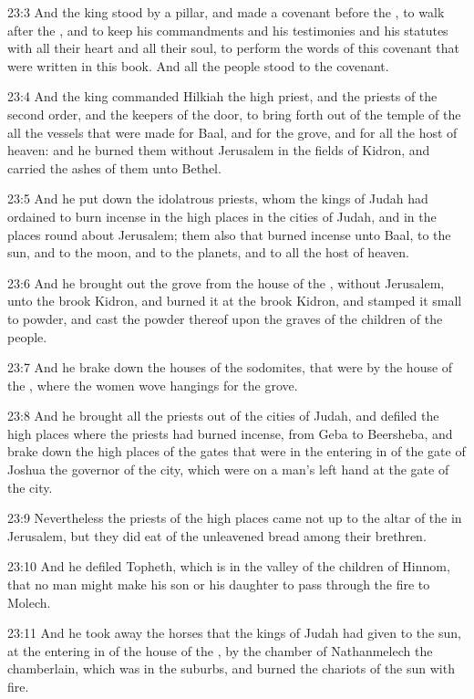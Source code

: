23:3 And the king stood by a pillar, and made a covenant before the \LORD, to walk after the \LORD, and to keep his commandments and his testimonies and his statutes with all their heart and all their soul, to perform the words of this covenant that were written in this book.  And all the people stood to the covenant.

23:4 And the king commanded Hilkiah the high priest, and the priests of the second order, and the keepers of the door, to bring forth out of the temple of the \LORD all the vessels that were made for Baal, and for the grove, and for all the host of heaven: and he burned them without Jerusalem in the fields of Kidron, and carried the ashes of them unto Bethel.

23:5 And he put down the idolatrous priests, whom the kings of Judah had ordained to burn incense in the high places in the cities of Judah, and in the places round about Jerusalem; them also that burned incense unto Baal, to the sun, and to the moon, and to the planets, and to all the host of heaven.

23:6 And he brought out the grove from the house of the \LORD, without Jerusalem, unto the brook Kidron, and burned it at the brook Kidron, and stamped it small to powder, and cast the powder thereof upon the graves of the children of the people.

23:7 And he brake down the houses of the sodomites, that were by the house of the \LORD, where the women wove hangings for the grove.

23:8 And he brought all the priests out of the cities of Judah, and defiled the high places where the priests had burned incense, from Geba to Beersheba, and brake down the high places of the gates that were in the entering in of the gate of Joshua the governor of the city, which were on a man's left hand at the gate of the city.

23:9 Nevertheless the priests of the high places came not up to the altar of the \LORD in Jerusalem, but they did eat of the unleavened bread among their brethren.

23:10 And he defiled Topheth, which is in the valley of the children of Hinnom, that no man might make his son or his daughter to pass through the fire to Molech.

23:11 And he took away the horses that the kings of Judah had given to the sun, at the entering in of the house of the \LORD, by the chamber of Nathanmelech the chamberlain, which was in the suburbs, and burned the chariots of the sun with fire.


